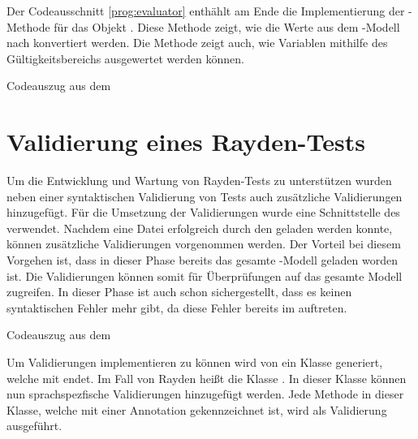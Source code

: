 \SuperPar
Der Codeausschnitt \ref{prog:evaluator} enthählt am Ende die Implementierung der -Methode für das Objekt . Diese Methode zeigt, wie die Werte aus dem -Modell nach  konvertiert werden. Die Methode zeigt auch, wie Variablen mithilfe des Gültigkeitsbereichs ausgewertet werden können.

\begin{program}

\caption{Codeauszug aus dem }
\label{prog:evaluator}
\end{program}

\clearpage
\section{Validierung eines Rayden-Tests}
\label{cha:validateKeyword}

Um die Entwicklung und Wartung von Rayden-Tests zu unterstützen wurden neben einer syntaktischen Validierung von Tests auch zusätzliche Validierungen hinzugefügt. Für die Umsetzung der Validierungen wurde eine Schnittstelle des  verwendet. Nachdem eine Datei erfolgreich durch den  geladen werden konnte, können zusätzliche Validierungen vorgenommen werden. Der Vorteil bei diesem Vorgehen ist, dass in dieser Phase bereits das gesamte -Modell geladen worden ist. Die Validierungen können somit für Überprüfungen auf das gesamte Modell zugreifen. In dieser Phase ist auch schon sichergestellt, dass es keinen syntaktischen Fehler mehr gibt, da diese Fehler bereits im  auftreten.

\begin{program}

\caption{Codeauszug aus dem }
\label{prog:validator}
\end{program}

\SuperPar
Um Validierungen implementieren zu können wird von  ein Klasse generiert, welche mit  endet. Im Fall von Rayden heißt die Klasse . In dieser Klasse können nun sprachspezfische Validierungen hinzugefügt werden. Jede Methode in dieser Klasse, welche mit einer  Annotation gekennzeichnet ist, wird als Validierung ausgeführt. 

